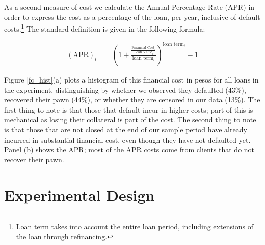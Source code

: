 \documentclass[oneside,11pt]{article}
\begin{document}
As a second measure of cost we calculate the Annual Percentage Rate (APR) in order to express the cost as a percentage of the loan, per year, inclusive of default costs.\footnote{Loan term takes into account the entire loan period, including extensions of the loan through refinancing.} The standard definition is given in the following formula:


\begin{align*}
    (\text{APR})_i =&\left( 1 + \frac{\frac{\text{Financial Cost}_i}{\text{Loan Value}_i}}{\text{loan term}_i}\right)^{\text{loan term}_i}-1 
\end{align*}

\vspace{.1in}

Figure \ref{fc_hist}(a) plots a histogram of this financial cost in pesos for all loans in the experiment, distinguishing by whether we observed they defaulted (43\%), recovered their pawn (44\%), or whether they are censored in our data (13\%). The first thing to note is that those that default incur in higher costs; part of this is mechanical as losing their collateral is part of the cost. The second thing to note is that those that are not closed at the end of our sample period have already incurred in substantial financial cost, even though they have not defaulted yet. Panel (b) shows the APR; most of the APR costs come from clients that do not recover their pawn. 





\section{Experimental Design} \label{Design}
\end{document}
